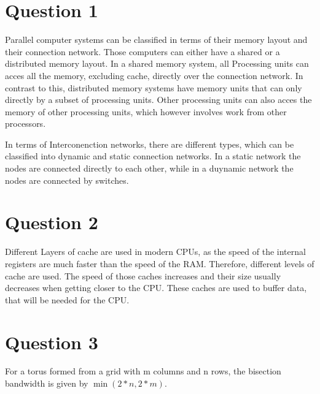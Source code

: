 \documentclass{article}
\begin{document}
\section{Question 1}
Parallel computer systems can be classified in terms of their memory layout and their connection network. Those computers can either have a shared or a distributed memory layout.
In a shared memory system, all Processing units can acces all the memory, excluding cache, directly over the connection network. In contrast to this, distributed memory systems have memory units that can only directly by a subset of processing units.
Other processing units can also acces the memory of other processing units, which however involves work from other processors. \par

In terms of Interconenction networks, there are different types, which can be classified into dynamic and static connection networks. In a static network the nodes are connected directly to each other, while in a 
duynamic network the nodes are connected by switches.
\section{Question 2}
Different Layers of cache are used in modern CPUs, as the speed of the internal registers are much faster than the speed of the RAM. Therefore, different levels of cache are used. The speed of those caches increases and their size usually decreases when getting closer to the CPU. These caches are used to buffer data, that will be needed for the CPU.

\section{Question 3}
For a torus formed from a grid with m columns and n rows, the bisection bandwidth is given by $\min\left(2*n, 2*m\right)$.
\end{document}
